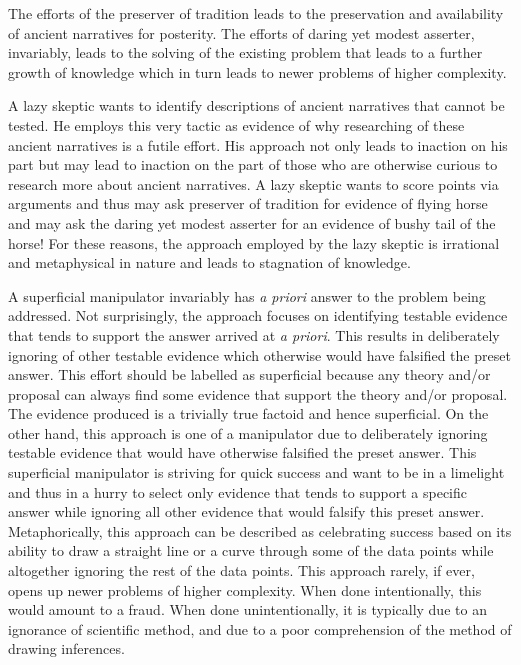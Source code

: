 The efforts of the preserver of tradition leads to the preservation and availability of ancient narratives for posterity. The efforts of daring yet modest asserter, invariably, leads to the solving of the existing problem that leads to a further growth of knowledge which in turn leads to newer problems of higher complexity.

\newpage

A lazy skeptic wants to identify descriptions of ancient narratives that cannot be tested. He employs this very tactic as evidence of why researching of these ancient narratives is a futile effort. His approach not only leads to inaction on his part but may lead to inaction on the part of those who are otherwise curious to research more about ancient narratives. A lazy skeptic wants to score points via arguments and thus may ask preserver of tradition for evidence of flying horse and may ask the daring yet modest asserter for an evidence of bushy tail of the horse! For these reasons, the approach employed by the lazy skeptic is irrational and metaphysical in nature and leads to stagnation of knowledge.

A superficial manipulator invariably has \textit{a priori} answer to the problem being addressed. Not surprisingly, the approach focuses on identifying testable evidence that tends to support the answer arrived at \textit{a priori}. This results in deliberately ignoring of other testable evidence which otherwise would have falsified the preset answer. This effort should be labelled as superficial because any theory and/or proposal can always find some evidence that support the theory and/or proposal. The evidence produced is a trivially true factoid and hence superficial. On the other hand, this approach is one of a manipulator due to deliberately ignoring testable evidence that would have otherwise falsified the preset answer. This superficial manipulator is striving for quick success and want to be in a limelight and thus in a hurry to select only evidence that tends to support a specific answer while ignoring all other evidence that would falsify this preset answer. Metaphorically, this approach can be described as celebrating success based on its ability to draw a straight line or a curve through some of the data points while altogether ignoring the rest of the data points. This approach rarely, if ever, opens up newer problems of higher complexity. When done intentionally, this would amount to a fraud. When done unintentionally, it is typically due to an ignorance of scientific method, and due to a poor comprehension of the method of drawing inferences.

